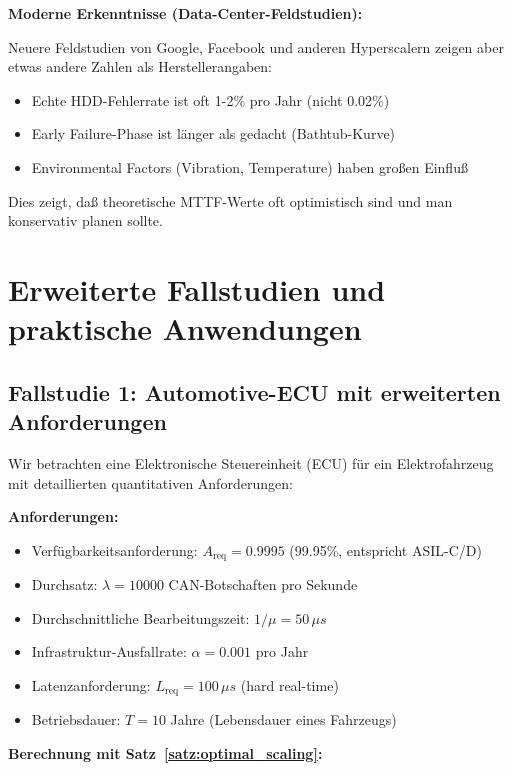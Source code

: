 \documentclass[a4paper,11pt]{article}
\theoremstyle{definition}
\begin{document}
\textbf{Moderne Erkenntnisse (Data-Center-Feldstudien):}

Neuere Feldstudien von Google, Facebook und anderen Hyperscalern zeigen aber etwas andere 
Zahlen als Herstellerangaben:
\begin{itemize}
    \item Echte HDD-Fehlerrate ist oft 1-2\% pro Jahr (nicht 0.02\%)
    \item Early Failure-Phase ist länger als gedacht (Bathtub-Kurve)
    \item Environmental Factors (Vibration, Temperature) haben großen Einfluß
\end{itemize}

Dies zeigt, daß theoretische MTTF-Werte oft optimistisch sind und man konservativ planen sollte.

\section{Erweiterte Fallstudien und praktische Anwendungen}

\subsection{Fallstudie 1: Automotive-ECU mit erweiterten Anforderungen}

Wir betrachten eine Elektronische Steuereinheit (ECU) für ein Elektrofahrzeug mit 
detaillierten quantitativen Anforderungen:

\textbf{Anforderungen:}
\begin{itemize}
    \item Verfügbarkeitsanforderung: $A_{\text{req}} = 0.9995$ (99.95\%, entspricht ASIL-C/D)
    \item Durchsatz: $\lambda = 10000$ CAN-Botschaften pro Sekunde
    \item Durchschnittliche Bearbeitungszeit: $1/\mu = 50 \, \mu s$
    \item Infrastruktur-Ausfallrate: $\alpha = 0.001$ pro Jahr
    \item Latenzanforderung: $L_{\text{req}} = 100 \, \mu s$ (hard real-time)
    \item Betriebsdauer: $T = 10$ Jahre (Lebensdauer eines Fahrzeugs)
\end{itemize}

\textbf{Berechnung mit Satz~\ref{satz:optimal_scaling}:}
\end{document}
